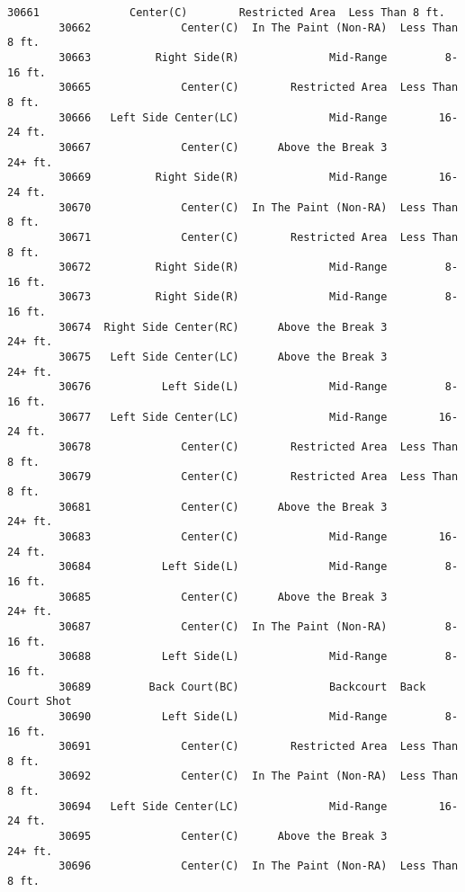 \documentclass[11pt]{article}
\begin{document}
\begin{Verbatim}[commandchars=\\\{\}]
        30661              Center(C)        Restricted Area  Less Than 8 ft.   
        30662              Center(C)  In The Paint (Non-RA)  Less Than 8 ft.   
        30663          Right Side(R)              Mid-Range         8-16 ft.   
        30665              Center(C)        Restricted Area  Less Than 8 ft.   
        30666   Left Side Center(LC)              Mid-Range        16-24 ft.   
        30667              Center(C)      Above the Break 3          24+ ft.   
        30669          Right Side(R)              Mid-Range        16-24 ft.   
        30670              Center(C)  In The Paint (Non-RA)  Less Than 8 ft.   
        30671              Center(C)        Restricted Area  Less Than 8 ft.   
        30672          Right Side(R)              Mid-Range         8-16 ft.   
        30673          Right Side(R)              Mid-Range         8-16 ft.   
        30674  Right Side Center(RC)      Above the Break 3          24+ ft.   
        30675   Left Side Center(LC)      Above the Break 3          24+ ft.   
        30676           Left Side(L)              Mid-Range         8-16 ft.   
        30677   Left Side Center(LC)              Mid-Range        16-24 ft.   
        30678              Center(C)        Restricted Area  Less Than 8 ft.   
        30679              Center(C)        Restricted Area  Less Than 8 ft.   
        30681              Center(C)      Above the Break 3          24+ ft.   
        30683              Center(C)              Mid-Range        16-24 ft.   
        30684           Left Side(L)              Mid-Range         8-16 ft.   
        30685              Center(C)      Above the Break 3          24+ ft.   
        30687              Center(C)  In The Paint (Non-RA)         8-16 ft.   
        30688           Left Side(L)              Mid-Range         8-16 ft.   
        30689         Back Court(BC)              Backcourt  Back Court Shot   
        30690           Left Side(L)              Mid-Range         8-16 ft.   
        30691              Center(C)        Restricted Area  Less Than 8 ft.   
        30692              Center(C)  In The Paint (Non-RA)  Less Than 8 ft.   
        30694   Left Side Center(LC)              Mid-Range        16-24 ft.   
        30695              Center(C)      Above the Break 3          24+ ft.   
        30696              Center(C)  In The Paint (Non-RA)  Less Than 8 ft.   
        

\end{Verbatim}
\end{document}
